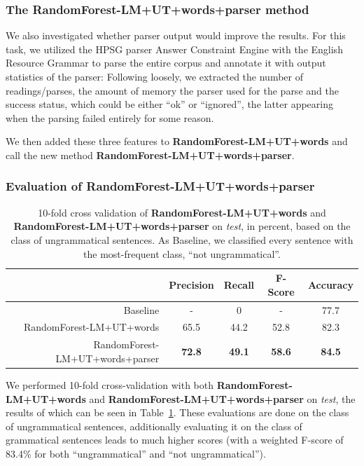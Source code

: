 \documentclass[a4paper,10pt]{scrartcl}
\theoremstyle{style}
\begin{document}
\subsubsection{The RandomForest-LM+UT+words+parser method}
\label{s_randomforestfull}
We also investigated whether parser output would improve the results. For this task, we utilized the HPSG parser Answer Constraint Engine \citep{ace} with the English Resource Grammar \citep{copestake2002implementing} to parse the entire corpus and annotate it with output statistics of the parser: Following \cite{wagner2007comparative} loosely, we extracted the number of readings/parses, the amount of memory the parser used for the parse and the success status, which could be either ``ok'' or ``ignored'', the latter appearing when the parsing failed entirely for some reason.

We then added these three features to \textbf{RandomForest-LM+UT+words} and call the new method \textbf{RandomForest-LM+UT+words+parser}.

\subsubsection{Evaluation of RandomForest-LM+UT+words+parser}

\begin{table}
\begin{center}
\begin{tabular}{|r|c|c|c|c|}
  \hline
  & \textbf{Precision} & \textbf{Recall} & \textbf{F-Score} & \textbf{Accuracy}\\
  \hline
  Baseline & - & 0 & - & 77.7\\
  \hline
  RandomForest-LM+UT+words & 65.5 & 44.2 & 52.8 & 82.3\\
  \hline
  RandomForest-LM+UT+words+parser & \textbf{72.8} & \textbf{49.1} & \textbf{58.6} & \textbf{84.5}\\
  \hline
  \end{tabular}
\end{center}
\caption{10-fold cross validation of \textbf{RandomForest-LM+UT+words} and \textbf{RandomForest-LM+UT+words+parser} on \textit{test}, in percent, based on the class of ungrammatical sentences. As Baseline, we classified every sentence with the most-frequent class, ``not ungrammatical''.}
\label{eval_randomforest}
\end{table}


We performed 10-fold cross-validation with both \textbf{RandomForest-LM+UT+words} and \textbf{RandomForest-LM+UT+words+parser} on \textit{test}, the results of which can be seen in Table~\ref{eval_randomforest}. These evaluations are done on the class of ungrammatical sentences, additionally evaluating it on the class of grammatical sentences leads to much higher scores (with a weighted F-score of 83.4\% for both ``ungrammatical'' and ``not ungrammatical'').
\end{document}
